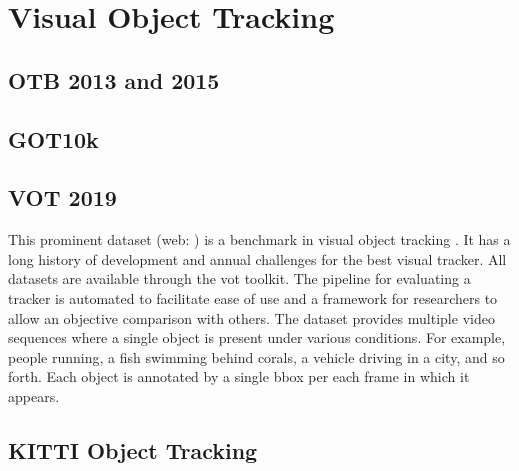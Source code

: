 \section{Visual Object Tracking}

\subsection{OTB 2013 and 2015}
\label{ssec:DatasetOTB1315}


\subsection{GOT10k}
\label{ssec:DatasetGOT10k}


\subsection{VOT 2019}
\label{ssec:DatasetVOT2019}


This prominent dataset (web: \cite{vot2019dataset}) is a benchmark in visual object tracking \cite{Kristan2019a}. It has a long history of development and annual challenges for the best visual tracker. All  datasets are available through the \gls{vot} toolkit. The pipeline for evaluating a tracker is automated to facilitate ease of use and a framework for researchers to allow an objective comparison with others. The dataset provides multiple video sequences where a single object is present under various conditions. For example, people running, a fish swimming behind corals, a vehicle driving in a city, and so forth. Each object is annotated by a single \gls{bbox} per each frame in which it appears.

\subsection{KITTI Object Tracking}
\label{ssec:DatasetKITTIObjectTracking}

